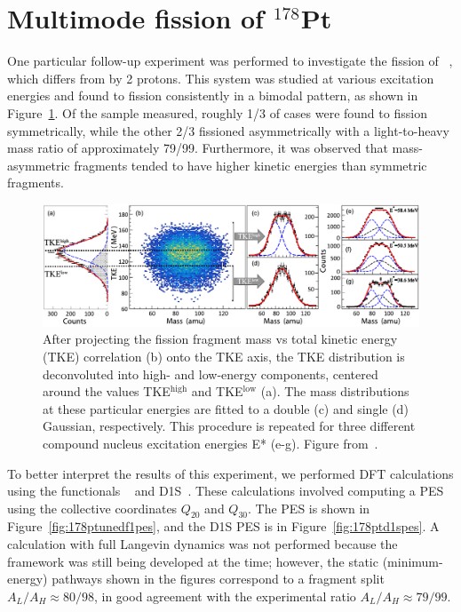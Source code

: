 \section{Multimode fission of $^{178}$Pt}

One particular follow-up experiment was performed to investigate the fission of {\Pt}~\cite{Tsekhanovich2019}, which differs from {\Hg} by 2 protons. This system was studied at various excitation energies and found to fission consistently in a bimodal pattern, as shown in Figure~\ref{fig:178ptexptdata}. Of the sample measured, roughly 1/3 of cases were found to fission symmetrically, while the other 2/3 fissioned asymmetrically with a light-to-heavy mass ratio of approximately 79/99. Furthermore, it was observed that mass-asymmetric fragments tended to have higher kinetic energies than symmetric fragments.

\begin{figure}
	\centering
	\includegraphics[width=0.95\linewidth]{TeX_files/178Pt_expt_data}
	\caption[After projecting the fission fragment mass vs total kinetic energy (TKE) correlation (b) onto the TKE axis, the TKE distribution is deconvoluted into high- and low-energy components, centered around the values TKE$^\mathrm{high}$ and TKE$^\mathrm{low}$ (a). The mass distributions at these particular energies are fitted to a double (c) and single (d) Gaussian, respectively. This procedure is repeated for three different compound nucleus excitation energies E* (e-g).]{After projecting the fission fragment mass vs total kinetic energy (TKE) correlation (b) onto the TKE axis, the TKE distribution is deconvoluted into high- and low-energy components, centered around the values TKE$^\mathrm{high}$ and TKE$^\mathrm{low}$ (a). The mass distributions at these particular energies are fitted to a double (c) and single (d) Gaussian, respectively. This procedure is repeated for three different compound nucleus excitation energies E* (e-g). Figure from~\cite{Tsekhanovich2019}.}
	\label{fig:178ptexptdata}
\end{figure}

To better interpret the results of this experiment, we performed DFT calculations using the functionals {\hfb}~\cite{Schunck2015} and D1S~\cite{Berger1989}. These calculations involved computing a PES using the collective coordinates $Q_{20}$ and $Q_{30}$. The {\hfb} PES is shown in Figure~\ref{fig:178ptunedf1pes}, and the D1S PES is in Figure~\ref{fig:178ptd1spes}. A calculation with full Langevin dynamics was not performed because the framework was still being developed at the time; however, the static (minimum-energy) pathways shown in the figures correspond to a fragment split $A_L/A_H \approx 80/98$, in good agreement with the experimental ratio $A_L/A_H \approx 79/99$.

